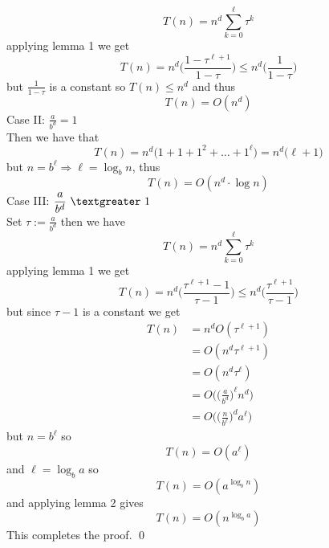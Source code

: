 \documentclass{article}
\newcommand{\gt}{\textgreater}
\newcommand{\imply}{\Rightarrow}
\newcommand{\x}{\cdot}
\newcommand{\ds}{\displaystyle}
\begin{document}
\[T(n) = n^d \sum_{k=0}^{\ell} \tau^{k}\]
applying lemma 1 we get
\[T(n) = n^d\bigg(\frac{1 - \tau^{\ell + 1}}{1 - \tau}\bigg) \leq n^d\Big(\frac{1}{1-\tau}\Big)\]
but $\ds \frac{1}{1-\tau}$ is a constant so $T(n) \leq n^d$ and thus
\[T(n) = O(n^d)\]
Case II: $\ds \frac{a}{b^d} = 1$\\
Then we have that
\[T(n) = n^d \big(1 + 1 + 1^2 + \dots + 1^{\ell}\big) = n^d\big(\ell + 1\big)\]
but $n = b^{\ell} \imply \ell = \log_{b}n$, thus
\[T(n) = O(n^d\x \log n)\]
Case III: $\displaystyle \frac{a}{b^d}\ \gt\ 1$\\
Set $\displaystyle \tau := \frac{a}{b^d}$ then we have
\[T(n) = n^d \sum_{k=0}^{\ell} \tau^{k}\]
applying lemma 1 we get
\[T(n) = n^d\bigg(\frac{\tau^{\ell + 1}-1}{\tau - 1}\bigg) \leq n^d\bigg(\frac{\tau^{\ell+1}}{\tau-1}\bigg)\]
but since $\tau -1$ is a constant we get
\begin{align*}
T(n) &= n^d O(\tau^{\ell + 1})\\
	&= O(n^d\tau^{\ell + 1})\\
	&= O(n^d\tau^{\ell})\\
	&= O\bigg(\Big(\frac{a}{b^{d}}\Big)^{\ell}n^{d}\bigg)\\
	&= O\bigg(\Big(\frac{n}{b^{\ell}}\Big)^da^{\ell}\bigg)
\end{align*}
but $n = b^{\ell}$ so
\[T(n) = O(a^{\ell})\]
and $\ell = \log_ba$ so
\[T(n) = O(a^{\log_bn})\]
and applying lemma 2 gives
\[T(n) = O(n^{\log_ba})\]
This completes the proof.
\qed
\end{document}
